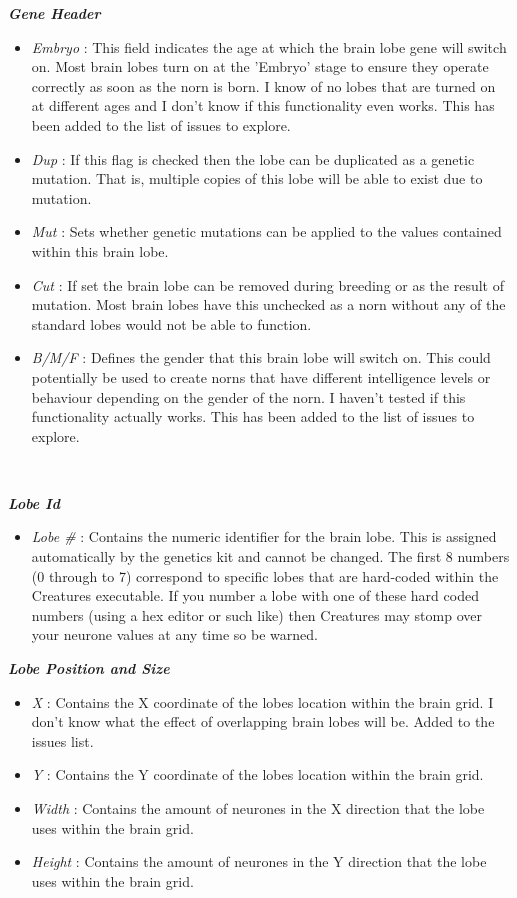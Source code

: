 \documentclass[11pt,twoside,a4paper]{article}
\begin{document}
\textbf{\textit{Gene Header}}
\begin{itemize}
	\item[] \emph{Embryo} : This field indicates the age at which the brain lobe gene will switch on. Most brain lobes turn on at the 'Embryo' stage to ensure they operate correctly as soon as the norn is born. I know of no lobes that are turned on at different ages and I don't know if this functionality even works. This has been added to the list of issues to explore.
	\item[] \emph{Dup} : If this flag is checked then the lobe can be duplicated as a genetic mutation. That is, multiple copies of this lobe will be able to exist due to mutation.
	\item[] \emph{Mut} : Sets whether genetic mutations can be applied to the values contained within this brain lobe.
	\item[] \emph{Cut} : If set the brain lobe can be removed during breeding or as the result of mutation. Most brain lobes have this unchecked as a norn without any of the standard lobes would not be able to function.
	\item[] \emph{B/M/F} : Defines the gender that this brain lobe will switch on. This could potentially be used to create norns that have different intelligence levels or behaviour depending on the gender of the norn. I haven't tested if this functionality actually works. This has been added to the list of issues to explore.
\end{itemize}~\\

\clearpage

\textbf{\textit{Lobe Id}}
\begin{itemize}
	\item[] \emph{Lobe \#} : Contains the numeric identifier for the brain lobe. This is assigned automatically by the genetics kit and cannot be changed. The first 8 numbers (0 through to 7) correspond to specific lobes that are hard-coded within the Creatures executable. If you number a lobe with one of these hard coded numbers (using a hex editor or such like) then Creatures may stomp over your neurone values at any time so be warned.
\end{itemize}

\textbf{\textit{Lobe Position and Size}}
\begin{itemize}
	\item[] \emph{X} : Contains the X coordinate of the lobes location within the brain grid. I don't know what the effect of overlapping brain lobes will be. Added to the issues list.
	\item[] \emph{Y} : Contains the Y coordinate of the lobes location within the brain grid.
	\item[] \emph{Width} : Contains the amount of neurones in the X direction that the lobe uses within the brain grid.
	\item[] \emph{Height} : Contains the amount of neurones in the Y direction that the lobe uses within the brain grid.
\end{itemize}
\end{document}
